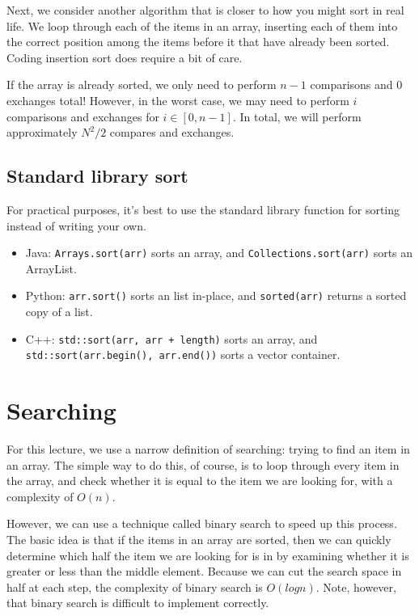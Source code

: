\documentclass{article}
\begin{document}
Next, we consider another algorithm that is closer to how you might sort in real life. We loop through each of the items in an array, inserting each of them into the correct position among the items before it that have already been sorted. Coding insertion sort does require a bit of care.

If the array is already sorted, we only need to perform $n-1$ comparisons and $0$ exchanges total! However, in the worst case, we may need to perform $i$ comparisons and exchanges for $i \in [0, n-1]$. In total, we will perform approximately $N^2/2$ compares and exchanges.


\subsection{Standard library sort}

For practical purposes, it's best to use the standard library function for sorting instead of writing your own.

\begin{itemize}
    \item Java: \texttt{Arrays.sort(arr)} sorts an array, and \texttt{Collections.sort(arr)} sorts an ArrayList.
    \item Python: \texttt{arr.sort()} sorts an list in-place, and \texttt{sorted(arr)} returns a sorted copy of a list.
    \item C++: \texttt{std::sort(arr, arr + length)} sorts an array, and \texttt{std::sort(arr.begin(), arr.end())} sorts a vector container.
\end{itemize}


\section{Searching}

For this lecture, we use a narrow definition of searching: trying to find an item in an array. The simple way to do this, of course, is to loop through every item in the array, and check whether it is equal to the item we are looking for, with a complexity of $O(n)$.

However, we can use a technique called binary search to speed up this process. The basic idea is that if the items in an array are sorted, then we can quickly determine which half the item we are looking for is in by examining whether it is greater or less than the middle element. Because we can cut the search space in half at each step, the complexity of binary search is $O(log n)$. Note, however, that binary search is difficult to implement correctly.
\end{document}
